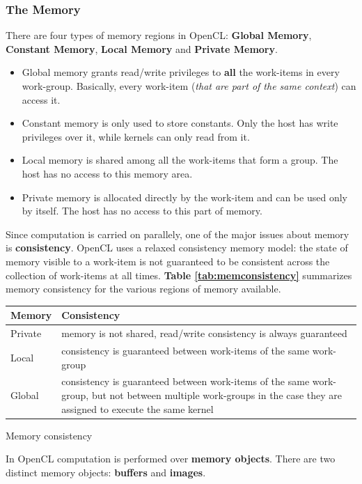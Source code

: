 \subsubsection{The Memory} \label{sect:memory}

There are four types of memory regions in OpenCL: \textbf{Global Memory}, \textbf{Constant Memory}, \textbf{Local Memory} and \textbf{Private Memory}.

\begin{itemize}
	\item Global memory grants read/write privileges to \textbf{all} the work-items in every work-group. Basically, every work-item (\emph{that are part of the same context}) can access it.
	\item Constant memory is only used to store constants. Only the host has write privileges over it, while kernels can only read from it.
	\item Local memory is shared among all the work-items that form a group. The host has no access to this memory area.
	\item Private memory is allocated directly by the work-item and can be used only by itself. The host has no access to this part of memory.
\end{itemize}

Since computation is carried on parallely, one of the major issues about memory is \textbf{consistency}. OpenCL uses a relaxed consistency memory model: the state of memory visible to a work-item is not guaranteed to be consistent across the collection of work-items at all times. \textbf{Table \ref{tab:memconsistency}} summarizes memory consistency for the various regions of memory available.\\

\begin{tablehere}
{\footnotesize
\begin{tabular}{|p{2cm}|p{}|} \hline
\textbf{Memory} & \textbf{Consistency}\\ \hline
Private & memory is not shared, read/write consistency is always guaranteed\\ \hline
Local & consistency is guaranteed between work-items of the same work-group\\ \hline
Global & consistency is guaranteed between work-items of the same work-group, but not between multiple work-groups in the case they are assigned to execute the same kernel\\ \hline
\end{tabular}}
\caption{Memory consistency\\}
\label{tab:memconsistency}
\end{tablehere}
In OpenCL computation is performed over \textbf{memory objects}. There are two distinct memory objects: \textbf{buffers} and \textbf{images}.

